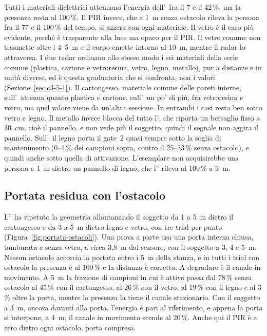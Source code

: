 Tutti i materiali dielettrici attenuano l'energia dell'\ldb\ fra il 7 e il 42\,\%, ma la presenza resta al 100\,\%. Il PIR invece, che a 1~m senza ostacolo rileva la persona fra il 77 e il 100\,\% del tempo, si azzera con ogni materiale. Il vetro è il caso più evidente, perché è trasparente alla luce ma opaco per il PIR. Il vetro comune non trasmette oltre i 4--5~\textmu m e il corpo emette intorno ai 10~\textmu m, mentre il radar lo attraversa. I due radar ordinano allo stesso modo i sei materiali della serie comune (plastica, cartone e vetroresina, vetro, legno, metallo), pur a distanze e in unità diverse, ed è questa graduatoria che si confronta, non i valori (Sezione~\ref{sec:c3-5-1}). Il cartongesso, materiale comune delle pareti interne, sull'\ldc\ attenua quanto plastica e cartone, sull'\ldb\ un po' di più, fra vetroresina e vetro, ma quel valore viene da un'altra sessione. In entrambi i casi resta ben sotto vetro e legno. Il metallo invece blocca del tutto l'\ldb, che riporta un bersaglio fisso a 30~cm, cioè il pannello, e non vede più il soggetto, quindi il segnale non aggira il pannello. Sull'\ldc\ il legno porta il gate~2 quasi sempre sotto la soglia di mantenimento (0--1\,\% dei campioni sopra, contro il 25--33\,\% senza ostacolo), e quindi anche sotto quella di attivazione. L'esemplare non acquisirebbe una persona a 1~m dietro un pannello di legno, che l'\ldb\ rileva al 100\,\% a 3~m.

\subsection{Portata residua con l'ostacolo}
\label{sec:ostacoli-portata}

L'\ldb\ ha ripetuto la geometria allontanando il soggetto da 1 a 5~m dietro il cartongesso e da 3 a 5~m dietro legno e vetro, con tre trial per punto (Figura~\ref{fig:portata-ostacoli}). Una prova a parte usa una porta interna chiusa, tamburata e senza vetro, a circa 3,8~m dal sensore, con il soggetto a 3, 4 e 5~m. Nessun ostacolo accorcia la portata entro i 5~m della stanza, e in tutti i trial con ostacolo la presenza è al 100\,\% e la distanza è corretta. A degradare è il canale in movimento. A 5~m la frazione di campioni in cui è attivo passa dal 78\,\% senza ostacolo al 45\,\% con il cartongesso, al 26\,\% con il vetro, al 19\,\% con il legno e al 3\,\% oltre la porta, mentre la presenza la tiene il canale stazionario. Con il soggetto a 3~m, ancora davanti alla porta, l'energia è pari al riferimento, e appena la porta si interpone, a 4~m, il canale in movimento scende al 20\,\%. Anche qui il PIR è a zero dietro ogni ostacolo, porta compresa.

